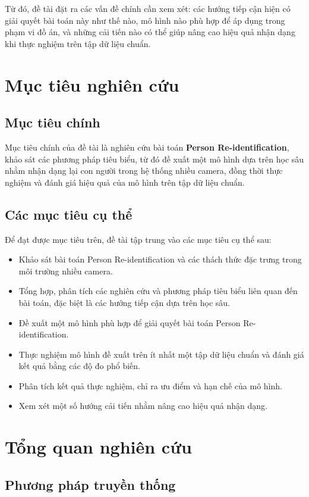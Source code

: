 Từ đó, đề tài đặt ra các vấn đề chính cần xem xét: các hướng tiếp cận hiện có giải quyết bài toán này như thế nào, mô hình nào phù hợp để áp dụng trong phạm vi đồ án, và những cải tiến nào có thể giúp nâng cao hiệu quả nhận dạng khi thực nghiệm trên tập dữ liệu chuẩn.

\section{Mục tiêu nghiên cứu}

\subsection{Mục tiêu chính}
Mục tiêu chính của đề tài là nghiên cứu bài toán \textbf{Person Re-identification}, khảo sát các phương pháp tiêu biểu, từ đó đề xuất một mô hình dựa trên học sâu nhằm nhận dạng lại con người trong hệ thống nhiều camera, đồng thời thực nghiệm và đánh giá hiệu quả của mô hình trên tập dữ liệu chuẩn.

\subsection{Các mục tiêu cụ thể}
Để đạt được mục tiêu trên, đề tài tập trung vào các mục tiêu cụ thể sau:
\begin{itemize}
    \item Khảo sát bài toán Person Re-identification và các thách thức đặc trưng trong môi trường nhiều camera.
    \item Tổng hợp, phân tích các nghiên cứu và phương pháp tiêu biểu liên quan đến bài toán, đặc biệt là các hướng tiếp cận dựa trên học sâu.
    \item Đề xuất một mô hình phù hợp để giải quyết bài toán Person Re-identification.
    \item Thực nghiệm mô hình đề xuất trên ít nhất một tập dữ liệu chuẩn và đánh giá kết quả bằng các độ đo phổ biến.
    \item Phân tích kết quả thực nghiệm, chỉ ra ưu điểm và hạn chế của mô hình.
    \item Xem xét một số hướng cải tiến nhằm nâng cao hiệu quả nhận dạng.
\end{itemize}

\section{Tổng quan nghiên cứu}
\subsection{Phương pháp truyền thống}
